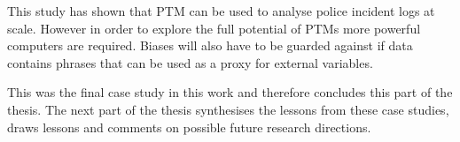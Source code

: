 This study has shown that PTM can be used to analyse police incident logs at scale. However in order to explore the full potential of PTMs more powerful computers are required. Biases will also have to be guarded against if data contains phrases that can be used as a proxy for external variables.

This was the final case study in this work and therefore concludes this part of the thesis. The next part of the thesis synthesises the lessons from these case studies, draws lessons and comments on possible future research directions.
 


